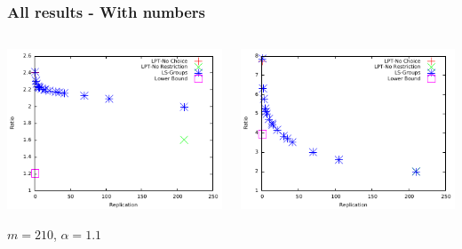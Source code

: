 \documentclass[usenames,dvipsnames]{beamer}
\begin{document}
\begin{frame}
  \frametitle{All results - With numbers}

  \vspace{-1.5em}

  \begin{columns}

    \begin{center}
      \includegraphics[width=\textwidth]{figs/alpha_11.pdf}
      
      {\footnotesize $m=210$, $\alpha=1.1$}
    \end{center}
    

  


    \begin{center}
      \includegraphics[width=\textwidth]{figs/alpha_2.pdf}
  

\end{center}
\end{columns}
\end{frame}
\end{document}
